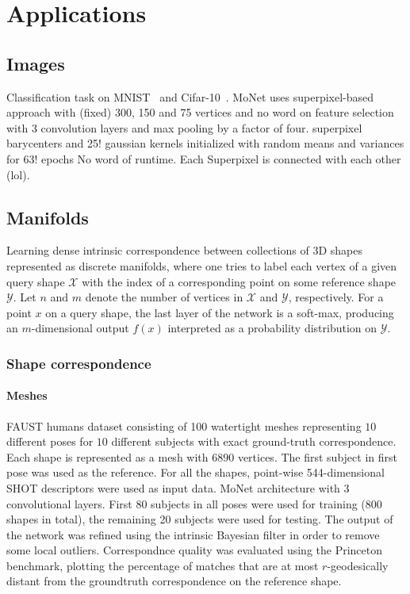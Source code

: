 \documentclass[pdftex,10pt,a4paper]{scrartcl}
\begin{document}
\section{Applications}

\subsection{Images}

Classification task on MNIST~\cite{mnist} and Cifar-10~\cite{cifar10}.
MoNet uses superpixel-based approach with (fixed) 300, 150 and 75 vertices and no word on feature selection with 3 convolution layers and max pooling by a factor of four.
superpixel barycenters and 25! gaussian kernels initialized with random means and variances for 63! epochs
No word of runtime.
Each Superpixel is connected with each other (lol).

\subsection{Manifolds}

Learning dense intrinsic correspondence between collections of 3D shapes represented as discrete manifolds, where one tries to label each vertex of a given query shape $\mathcal{X}$ with the index of a corresponding point on some reference shape $\mathcal{Y}$.
Let $n$ and $m$ denote the number of vertices in $\mathcal{X}$ and $\mathcal{Y}$, respectively.
For a point $x$ on a query shape, the last layer of the network is a soft-max, producing an $m$-dimensional output $f(x)$ interpreted as a probability distribution on $\mathcal{Y}$.

\subsubsection{Shape correspondence}

\paragraph{Meshes}

FAUST humans dataset consisting of 100 watertight meshes representing $10$ different poses for $10$ different subjects with exact ground-truth correspondence.
Each shape is represented as a mesh with $6890$ vertices.
The first subject in first pose was used as the reference.
For all the shapes, point-wise 544-dimensional SHOT descriptors were used as input data.
MoNet architecture with 3 convolutional layers.
First 80 subjects in all poses were used for training (800 shapes in total), the remaining 20 subjects were used for testing.
The output of the network was refined using the intrinsic Bayesian filter in order to remove some local outliers.
Correspondnce quality was evaluated using the Princeton benchmark, plotting the percentage of matches that are at most $r$-geodesically distant from the groundtruth correspondence on the reference shape.
\end{document}
